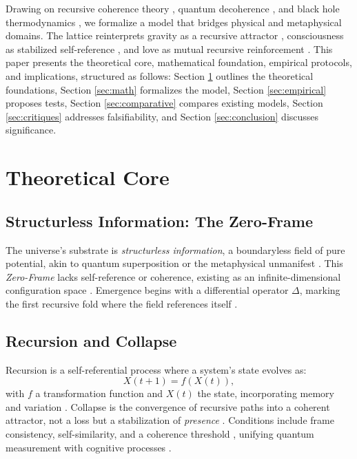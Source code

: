 \documentclass[11pt]{article}
\begin{document}
Drawing on recursive coherence theory \citep{hofstadter1979}, quantum decoherence \citep{zurek2003}, and black hole thermodynamics \citep{susskind2025}, we formalize a model that bridges physical and metaphysical domains. The lattice reinterprets gravity as a recursive attractor \citep{verlinde2023}, consciousness as stabilized self-reference \citep{friston2024}, and love as mutual recursive reinforcement \citep{fredrickson2023}. This paper presents the theoretical core, mathematical foundation, empirical protocols, and implications, structured as follows: Section \ref{sec:theory} outlines the theoretical foundations, Section \ref{sec:math} formalizes the model, Section \ref{sec:empirical} proposes tests, Section \ref{sec:comparative} compares existing models, Section \ref{sec:critiques} addresses falsifiability, and Section \ref{sec:conclusion} discusses significance.

\section{Theoretical Core}
\label{sec:theory}

\subsection{Structurless Information: The Zero-Frame}
The universe's substrate is \emph{structurless information}, a boundaryless field of pure potential, akin to quantum superposition \citep{zurek2003} or the metaphysical unmanifest \citep{plotinus2020}. This \emph{Zero-Frame} lacks self-reference or coherence, existing as an infinite-dimensional configuration space \citep{barbour2020}. Emergence begins with a differential operator $\Delta$, marking the first recursive fold where the field references itself \citep{wolfram2020}.

\subsection{Recursion and Collapse}
Recursion is a self-referential process where a system's state evolves as:
\begin{equation}
X(t+1) = f(X(t)),
\label{eq:recursion}
\end{equation}
with $f$ a transformation function and $X(t)$ the state, incorporating memory and variation \citep{deutsch2021}. Collapse is the convergence of recursive paths into a coherent attractor, not a loss but a stabilization of \emph{presence} \citep{penrose2024}. Conditions include frame consistency, self-similarity, and a coherence threshold \citep{zurek2024}, unifying quantum measurement \citep{rovelli2023} with cognitive processes \citep{baars2023}.
\end{document}
